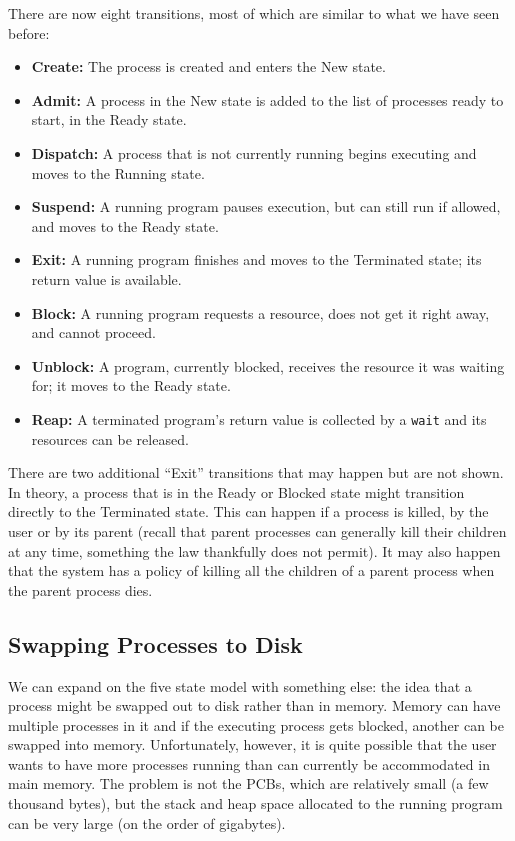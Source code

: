 \documentclass[a4paper]{report}
\begin{document}
There are now eight transitions, most of which are similar to what we have seen before:

\begin{itemize}
	\item \textbf{Create:} The process is created and enters the New state.
	\item \textbf{Admit:} A process in the New state is added to the list of processes ready to start, in the Ready state.
	\item \textbf{Dispatch:} A process that is not currently running begins executing and moves to the Running state.
	\item \textbf{Suspend:} A running program pauses execution, but can still run if allowed, and moves to the Ready state.
	\item \textbf{Exit:} A running program finishes and moves to the Terminated state; its return value is available.
	\item \textbf{Block:} A running program requests a resource, does not get it right away, and cannot proceed.
	\item \textbf{Unblock:} A program, currently blocked, receives the resource it was waiting for; it moves to the Ready state.
	\item \textbf{Reap:} A terminated program's return value is collected by a \texttt{wait} and its resources can be released.
\end{itemize}

There are two additional ``Exit'' transitions that may happen but are not shown. In theory, a process that is in the Ready or Blocked state might transition directly to the Terminated state. This can happen if a process is killed, by the user or by its parent (recall that parent processes can generally kill their children at any time, something the law thankfully does not permit). It may also happen that the system has a policy of killing all the children of a parent process when the parent process dies.

\subsection*{Swapping Processes to Disk}
We can expand on the five state model with something else: the idea that a process might be swapped out to disk rather than in memory. Memory can have multiple processes in it and if the executing process gets blocked, another can be swapped into memory. Unfortunately, however, it is quite possible that the user wants to have more processes running than can currently be accommodated in main memory. The problem is not the PCBs, which are relatively small (a few thousand bytes), but the stack and heap space allocated to the running program can be very large (on the order of gigabytes).
\end{document}
